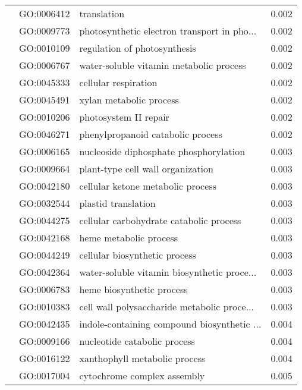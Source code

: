 \begin{longtable}{lllr}
   & GO:0006412 &                                  translation &         0.002 \\
   & GO:0009773 &  photosynthetic electron transport in pho... &         0.002 \\
   & GO:0010109 &                 regulation of photosynthesis &         0.002 \\
   & GO:0006767 &      water-soluble vitamin metabolic process &         0.002 \\
   & GO:0045333 &                         cellular respiration &         0.002 \\
   & GO:0045491 &                      xylan metabolic process &         0.002 \\
   & GO:0010206 &                        photosystem II repair &         0.002 \\
   & GO:0046271 &            phenylpropanoid catabolic process &         0.002 \\
   & GO:0006165 &       nucleoside diphosphate phosphorylation &         0.003 \\
   & GO:0009664 &            plant-type cell wall organization &         0.003 \\
   & GO:0042180 &            cellular ketone metabolic process &         0.003 \\
   & GO:0032544 &                          plastid translation &         0.003 \\
   & GO:0044275 &      cellular carbohydrate catabolic process &         0.003 \\
   & GO:0042168 &                       heme metabolic process &         0.003 \\
   & GO:0044249 &                cellular biosynthetic process &         0.003 \\
   & GO:0042364 &  water-soluble vitamin biosynthetic proce... &         0.003 \\
   & GO:0006783 &                    heme biosynthetic process &         0.003 \\
   & GO:0010383 &  cell wall polysaccharide metabolic proce... &         0.003 \\
   & GO:0042435 &  indole-containing compound biosynthetic ... &         0.004 \\
   & GO:0009166 &                 nucleotide catabolic process &         0.004 \\
   & GO:0016122 &                xanthophyll metabolic process &         0.004 \\
   & GO:0017004 &                  cytochrome complex assembly &         0.005 \\

\end{longtable}
